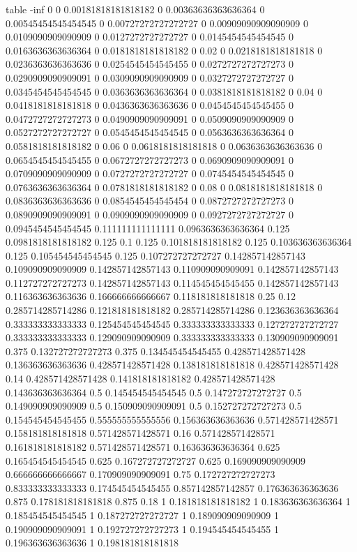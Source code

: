 table {%
-inf 0
0 0.00181818181818182
0 0.00363636363636364
0 0.00545454545454545
0 0.00727272727272727
0 0.00909090909090909
0 0.0109090909090909
0 0.0127272727272727
0 0.0145454545454545
0 0.0163636363636364
0 0.0181818181818182
0 0.02
0 0.0218181818181818
0 0.0236363636363636
0 0.0254545454545455
0 0.0272727272727273
0 0.0290909090909091
0 0.0309090909090909
0 0.0327272727272727
0 0.0345454545454545
0 0.0363636363636364
0 0.0381818181818182
0 0.04
0 0.0418181818181818
0 0.0436363636363636
0 0.0454545454545455
0 0.0472727272727273
0 0.0490909090909091
0 0.0509090909090909
0 0.0527272727272727
0 0.0545454545454545
0 0.0563636363636364
0 0.0581818181818182
0 0.06
0 0.0618181818181818
0 0.0636363636363636
0 0.0654545454545455
0 0.0672727272727273
0 0.0690909090909091
0 0.0709090909090909
0 0.0727272727272727
0 0.0745454545454545
0 0.0763636363636364
0 0.0781818181818182
0 0.08
0 0.0818181818181818
0 0.0836363636363636
0 0.0854545454545454
0 0.0872727272727273
0 0.0890909090909091
0 0.0909090909090909
0 0.0927272727272727
0 0.0945454545454545
0.111111111111111 0.0963636363636364
0.125 0.0981818181818182
0.125 0.1
0.125 0.101818181818182
0.125 0.103636363636364
0.125 0.105454545454545
0.125 0.107272727272727
0.142857142857143 0.109090909090909
0.142857142857143 0.110909090909091
0.142857142857143 0.112727272727273
0.142857142857143 0.114545454545455
0.142857142857143 0.116363636363636
0.166666666666667 0.118181818181818
0.25 0.12
0.285714285714286 0.121818181818182
0.285714285714286 0.123636363636364
0.333333333333333 0.125454545454545
0.333333333333333 0.127272727272727
0.333333333333333 0.129090909090909
0.333333333333333 0.130909090909091
0.375 0.132727272727273
0.375 0.134545454545455
0.428571428571428 0.136363636363636
0.428571428571428 0.138181818181818
0.428571428571428 0.14
0.428571428571428 0.141818181818182
0.428571428571428 0.143636363636364
0.5 0.145454545454545
0.5 0.147272727272727
0.5 0.149090909090909
0.5 0.150909090909091
0.5 0.152727272727273
0.5 0.154545454545455
0.555555555555556 0.156363636363636
0.571428571428571 0.158181818181818
0.571428571428571 0.16
0.571428571428571 0.161818181818182
0.571428571428571 0.163636363636364
0.625 0.165454545454545
0.625 0.167272727272727
0.625 0.169090909090909
0.666666666666667 0.170909090909091
0.75 0.172727272727273
0.833333333333333 0.174545454545455
0.857142857142857 0.176363636363636
0.875 0.178181818181818
0.875 0.18
1 0.181818181818182
1 0.183636363636364
1 0.185454545454545
1 0.187272727272727
1 0.189090909090909
1 0.190909090909091
1 0.192727272727273
1 0.194545454545455
1 0.196363636363636
1 0.198181818181818
}
